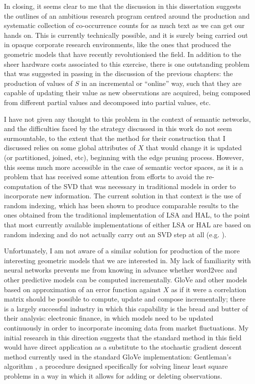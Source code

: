 In closing, it seems clear to me that the discussion in this dissertation suggests the outlines of an ambitious research program centred around the production and systematic collection of co-occurrence counts for as much text as we can get our hands on.
This is currently technically possible, and it is surely being carried out in opaque corporate research environments, like the ones that produced the geometric models that have recently revolutionised the field.
In addition to the sheer hardware costs associated to this exercise, there is one outstanding problem that was suggested in passing in the discussion of the previous chapters: the production of values of $S$ in an incremental or ``online'' way, such that they are capable of updating their value as new observations are acquired, being composed from different partial values and decomposed into partial values, etc.

I have not given any thought to this problem in the context of semantic networks, and the difficulties faced by the strategy discussed in this work do not seem surmountable, to the extent that the method for their construction that I discussed relies on some global attributes of $X$ that would change it is updated (or partitioned, joined, etc), beginning with the edge pruning process.
However, this seems much more accessible in the case of semantic vector spaces, as it is a problem that has received some attention from efforts to avoid the re-computation of the SVD that was necessary in traditional models in order to incorporate new information.
The current solution in that context is the use of random indexing, which has been shown to produce comparable results to the ones obtained from the traditional implementation of LSA and HAL, to the point that most currently available implementations of either LSA or HAL are based on random indexing and do not actually carry out an SVD step at all (e.g. \citet{widdows2010}).

Unfortunately, I am not aware of a similar solution for production of the more interesting geometric models that we are interested in.
My lack of familiarity with neural networks prevents me from knowing in advance whether word2vec and other predictive models can be computed incrementally.
GloVe and other models based on approximation of an error function against $X$ as if it were a correlation matrix should be possible to compute, update and compose incrementally; there is a largely successful industry in which this capability is the bread and butter of their analysis: electronic finance, in which models need to be updated continuously in order to incorporate incoming data from market fluctuations.
My initial research in this direction suggests that the standard method in this field would have direct application as a substitute to the stochastic gradient descent method currently used in the standard GloVe implementation: Gentleman's algorithm \citep{gentleman1974,miller1992}, a procedure designed specifically for solving linear least square problems in a way in which it allows for adding or deleting observations.
